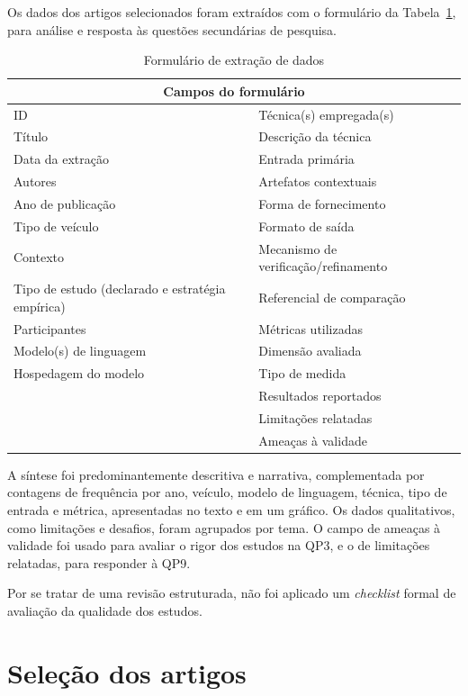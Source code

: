 Os dados dos artigos selecionados foram extraídos com o formulário da Tabela~\ref{tab:formulario}, para análise e resposta às questões secundárias de pesquisa.

\begin{table}[H]
  \centering
  \caption{Formulário de extração de dados}
  \label{tab:formulario}
  \small
  \begin{tabular}{|p{}|p{}|}
    \hline
    \multicolumn{2}{|c|}{\textbf{Campos do formulário}} \\ \hline
    ID & Técnica(s) empregada(s) \\
    Título & Descrição da técnica \\
    Data da extração & Entrada primária \\
    Autores & Artefatos contextuais \\
    Ano de publicação & Forma de fornecimento \\
    Tipo de veículo & Formato de saída \\
    Contexto & Mecanismo de verificação/refinamento \\
    Tipo de estudo (declarado e estratégia empírica) & Referencial de comparação \\
    Participantes & Métricas utilizadas \\
    Modelo(s) de linguagem & Dimensão avaliada \\
    Hospedagem do modelo & Tipo de medida \\
     & Resultados reportados \\
     & Limitações relatadas \\
     & Ameaças à validade \\ \hline
  \end{tabular}
\end{table}

A síntese foi predominantemente descritiva e narrativa, complementada por contagens de frequência por ano, veículo, modelo de linguagem, técnica, tipo de entrada e métrica, apresentadas no texto e em um gráfico. Os dados qualitativos, como limitações e desafios, foram agrupados por tema. O campo de ameaças à validade foi usado para avaliar o rigor dos estudos na QP3, e o de limitações relatadas, para responder à QP9.

Por se tratar de uma revisão estruturada, não foi aplicado um \textit{checklist} formal de avaliação da qualidade dos estudos.

\section{Seleção dos artigos}
\label{sec:selecao}

